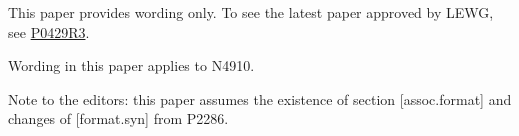 
% 

This paper provides wording only.  To see the latest paper approved by LEWG,
see \href{http://www.open-std.org/jtc1/sc22/wg21/docs/papers/2017/p0429r3.pdf}{P0429R3}.

Wording in this paper applies to N4910.

Note to the editors: this paper assumes the existence of section
[assoc.format] and changes of [format.syn] from P2286.

\markboth{\contentsname}{}

\makeatletter
\renewcommand\@pnumwidth{2.5em}
\makeatother

\tableofcontents
\setcounter{tocdepth}{5}

%
